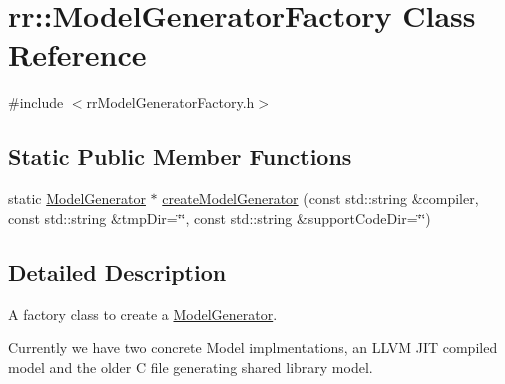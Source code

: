 \hypertarget{classrr_1_1_model_generator_factory}{\section{rr\-:\-:Model\-Generator\-Factory Class Reference}
\label{classrr_1_1_model_generator_factory}
}


{\ttfamily \#include $<$rr\-Model\-Generator\-Factory.\-h$>$}

\subsection*{Static Public Member Functions}
\begin{DoxyCompactItemize}
\item 
static \hyperlink{classrr_1_1_model_generator}{Model\-Generator} $\ast$ \hyperlink{classrr_1_1_model_generator_factory_a18bbc77aa4d70ade95d607f64198ea7a}{create\-Model\-Generator} (const std\-::string \&compiler, const std\-::string \&tmp\-Dir=\char`\"{}\char`\"{}, const std\-::string \&support\-Code\-Dir=\char`\"{}\char`\"{})
\end{DoxyCompactItemize}


\subsection{Detailed Description}
A factory class to create a \hyperlink{classrr_1_1_model_generator}{Model\-Generator}.

Currently we have two concrete Model implmentations, an L\-L\-V\-M J\-I\-T compiled model and the older C file generating shared library model. 

